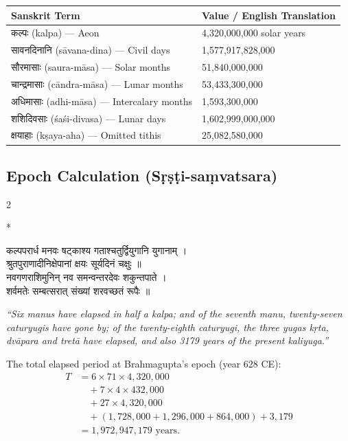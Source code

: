 \documentclass[11pt,a4paper]{article}
\newcommand{\dev}[1]{{\devanagarifont #1}}
\theoremstyle{definition}
\begin{document}
\begin{longtable}{p{}p{}}
\toprule
\textbf{Sanskrit Term} & \textbf{Value / English Translation} \\
\midrule
\endhead
\dev{कल्पः} (kalpa) --- Aeon & 4,320,000,000 solar years \\
\dev{सावनदिनानि} (s\=avana-dina) --- Civil days & 1,577,917,828,000 \\
\dev{सौरमासाः} (saura-m\=asa) --- Solar months & 51,840,000,000 \\
\dev{चान्द्रमासाः} (c\=andra-m\=asa) --- Lunar months & 53,433,300,000 \\
\dev{अधिमासाः} (adhi-m\=asa) --- Intercalary months & 1,593,300,000 \\
\dev{शशिदिवसाः} ({\'{s}}a\'{s}i-divasa) --- Lunar days & 1,602,999,000,000 \\
\dev{क्षयाहाः} (k\d{s}aya-aha) --- Omitted tithis & 25,082,580,000 \\
\bottomrule
\end{longtable}

\subsection*{Epoch Calculation (S\d{r}\d{s}\d{t}i-sa\d{m}vatsara)}

\begin{paracol}{2}

\switchcolumn[0]*\noindent
\begin{tcolorbox}[colback=sktbg,colframe=vertrule,boxrule=0.5pt,arc=3pt]
\dev{कल्पपरार्ध मनवः षट्काश्य गताश्चतुर्द्वियुगानि युगानाम् ।\\
श्रुतपुराणादीनिक्षेपानां क्षयः सूर्यदिनं चक्षुः ॥}\\[0.3cm]
\dev{नवगणराशिमुनिन् नव समन्वन्तरदेवः शकुन्तपाते ।\\
शर्वमतेः सम्बत्सरात् संख्यां शरवच्छतं रूपैः ॥}
\end{tcolorbox}

\switchcolumn\noindent
\begin{tcolorbox}[colback=transbg,colframe=vertrule!60,boxrule=0.5pt,arc=3pt]
\textit{``Six manus have elapsed in half a kalpa; and of the seventh manu, twenty-seven caturyugis have gone by; of the twenty-eighth caturyugi, the three yugas k\d{r}ta, dv\=apara and tret\=a have elapsed, and also 3179 years of the present kaliyuga.''}

The total elapsed period at Brahmagupta's epoch (year 628 CE):
\begin{align*}
T &= 6 \times 71 \times 4{,}320{,}000 \\
  &\quad + 7 \times 4 \times 432{,}000 \\
  &\quad + 27 \times 4{,}320{,}000 \\
  &\quad + (1{,}728{,}000 + 1{,}296{,}000 + 864{,}000) + 3{,}179 \\
  &= 1{,}972{,}947{,}179 \text{ years.}
\end{align*}
\end{tcolorbox}

\end{paracol}
\end{document}

